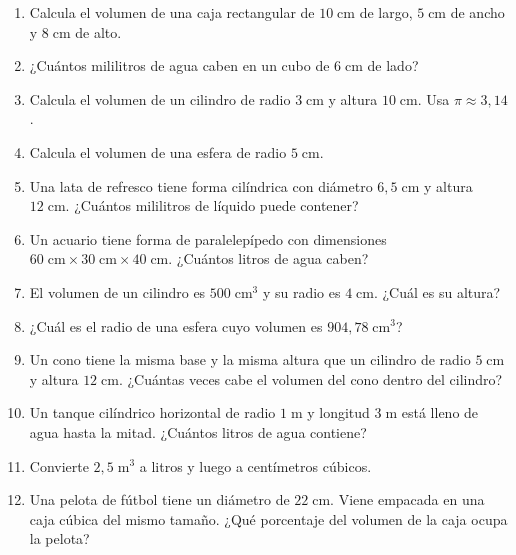 \documentclass[12pt, a4paper]{article}
\begin{document}
\begin{enumerate}[leftmargin=*, resume]
  \item \facil{} Calcula el volumen de una caja rectangular de $10\;\text{cm}$ de largo, $5\;\text{cm}$ de ancho y $8\;\text{cm}$ de alto.

  \item \facil{} ¿Cuántos mililitros de agua caben en un cubo de $6\;\text{cm}$ de lado?

  \item \facil{} Calcula el volumen de un cilindro de radio $3\;\text{cm}$ y altura $10\;\text{cm}$. Usa $\pi \approx 3{,}14$.

  \item \facil{} Calcula el volumen de una esfera de radio $5\;\text{cm}$.

  \item \medio{} Una lata de refresco tiene forma cilíndrica con diámetro $6{,}5\;\text{cm}$ y altura $12\;\text{cm}$. ¿Cuántos mililitros de líquido puede contener?

  \item \medio{} Un acuario tiene forma de paralelepípedo con dimensiones $60\;\text{cm} \times 30\;\text{cm} \times 40\;\text{cm}$. ¿Cuántos litros de agua caben?

  \item \medio{} El volumen de un cilindro es $500\;\text{cm}^3$ y su radio es $4\;\text{cm}$. ¿Cuál es su altura?

  \item \medio{} ¿Cuál es el radio de una esfera cuyo volumen es $904{,}78\;\text{cm}^3$?

  \item \dificil{} Un cono tiene la misma base y la misma altura que un cilindro de radio $5\;\text{cm}$ y altura $12\;\text{cm}$. ¿Cuántas veces cabe el volumen del cono dentro del cilindro?

  \item \dificil{} Un tanque cilíndrico horizontal de radio $1\;\text{m}$ y longitud $3\;\text{m}$ está lleno de agua hasta la mitad. ¿Cuántos litros de agua contiene?

  \item \dificil{} Convierte $2{,}5\;\text{m}^3$ a litros y luego a centímetros cúbicos.

  \item \dificil{} Una pelota de fútbol tiene un diámetro de $22\;\text{cm}$. Viene empacada en una caja cúbica del mismo tamaño. ¿Qué porcentaje del volumen de la caja ocupa la pelota?
\end{enumerate}
\end{document}
